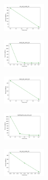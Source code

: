 \begin{figure}[H]
    \centering
    \begin{subfigure}
        \centering
        \includegraphics[width=0.234\textwidth]{img/copkm2/iris_set_const_20_949004259_cost.png}
    \end{subfigure}
    \hfill
    \begin{subfigure}
        \centering
        \includegraphics[width=0.234\textwidth]{img/copkm2/ecoli_set_const_20_949004259_cost.png}
    \end{subfigure}
    \hfill
    \begin{subfigure}
        \centering
        \includegraphics[width=0.234\textwidth]{img/copkm2/rand_set_const_20_949004259_cost.png}
    \end{subfigure}
    \hfill
    \begin{subfigure}
        \centering
        \includegraphics[width=0.234\textwidth]{img/copkm2/newthyroid_set_const_20_949004259_cost.png}
    \end{subfigure}
    \hfill
    \begin{subfigure}
        \centering
        \includegraphics[width=0.234\textwidth]{img/copkm2/iris_set_const_20_589741062_cost.png}
    \end{subfigure}
    \hfill

\end{figure}

